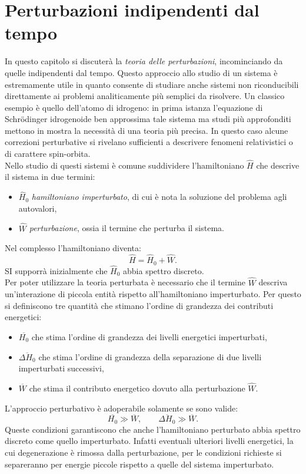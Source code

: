 \section{Perturbazioni indipendenti dal tempo}
In questo capitolo si discuterà la \emph{teoria delle perturbazioni}, incominciando da quelle indipendenti dal tempo. Questo approccio allo studio di un sistema è estremamente utile in quanto consente di studiare anche sistemi non riconducibili direttamente ai problemi analiticamente più semplici da risolvere. Un classico esempio è quello dell'atomo di idrogeno: in prima istanza l'equazione di Schrödinger idrogenoide ben approssima tale sistema ma studi più approfonditi mettono in mostra la necessità di una teoria più precisa. In questo caso alcune correzioni perturbative si rivelano sufficienti a descrivere fenomeni relativistici o di carattere spin-orbita.\\

Nello studio di questi sistemi è comune suddividere l'hamiltoniano $\hat{H}$ che descrive il sistema in due termini:
\begin{itemize}
    \item $\hat{H}_0$ \emph{hamiltoniano imperturbato}, di cui è nota la soluzione del problema agli autovalori,
    \item $\hat{W}$ \emph{perturbazione}, ossia il termine che perturba il sistema.
\end{itemize}
Nel complesso l'hamiltoniano diventa:
\begin{equation}
    \hat{H}=\hat{H}_0+\hat{W}.\label{H Perturbata}
\end{equation}
SI supporrà inizialmente che $\hat{H}_0$ abbia spettro discreto.\\
Per poter utilizzare la teoria perturbata è necessario che il termine $\hat{W}$ descriva un'interazione di piccola entità rispetto all'hamiltoniano imperturbato. Per questo si definiscono tre quantità che stimano l'ordine di grandezza dei contributi energetici:
\begin{itemize}
    \item $\overline{H_0}$ che stima l'ordine di grandezza dei livelli energetici imperturbati,
    \item $\overline{\Delta H_0}$ che stima l'ordine di grandezza della separazione di due livelli imperturbati successivi,
    \item $\overline{W}$ che stima il contributo energetico dovuto alla perturbazione $\hat{W}$.
\end{itemize}
L'approccio perturbativo è adoperabile solamente se sono valide:
\begin{equation}
    \overline{H_0}\gg \overline{W}, \qquad \overline{\Delta H_0}\gg \overline{W}.
\end{equation}
Queste condizioni garantiscono che anche l'hamiltoniano perturbato abbia spettro discreto come quello imperturbato. Infatti eventuali ulteriori livelli energetici, la cui degenerazione è rimossa dalla perturbazione, per le condizioni richieste si separeranno per energie piccole rispetto a quelle del sistema imperturbato.\\

